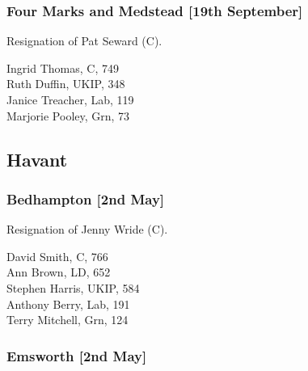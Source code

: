 \documentclass[a4paper,openany,10pt]{book}
\begin{document}
\subsubsection*{Four Marks and Medstead \hspace*{\fill}\nolinebreak[1]%
\enspace\hspace*{\fill}
[19th September]}


Resignation of Pat Seward (C).



Ingrid Thomas, C, 749\\
Ruth Duffin, UKIP, 348\\
Janice Treacher, Lab, 119\\
Marjorie Pooley, Grn, 73\\


\subsection*{Havant}

\subsubsection*{Bedhampton \hspace*{\fill}\nolinebreak[1]%
\enspace\hspace*{\fill}
[2nd May]}


Resignation of Jenny Wride (C).



David Smith, C, 766\\
Ann Brown, LD, 652\\
Stephen Harris, UKIP, 584\\
Anthony Berry, Lab, 191\\
Terry Mitchell, Grn, 124\\


\subsubsection*{Emsworth \hspace*{\fill}\nolinebreak[1]%
\enspace\hspace*{\fill}
[2nd May]}

\end{document}

